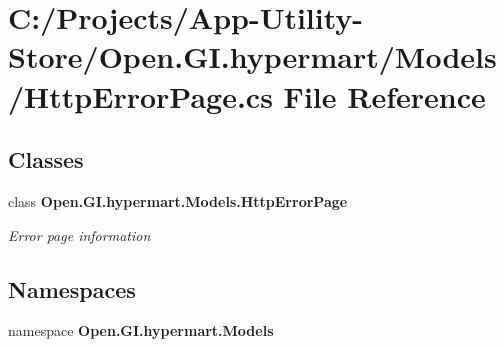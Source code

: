 \section{C\+:/\+Projects/\+App-\/\+Utility-\/\+Store/\+Open.G\+I.\+hypermart/\+Models/\+Http\+Error\+Page.cs File Reference}
\label{_http_error_page_8cs}
\subsection*{Classes}
\begin{DoxyCompactItemize}
\item 
class \textbf{ Open.\+G\+I.\+hypermart.\+Models.\+Http\+Error\+Page}
\begin{DoxyCompactList}\small\item\em Error page information \end{DoxyCompactList}\end{DoxyCompactItemize}
\subsection*{Namespaces}
\begin{DoxyCompactItemize}
\item 
namespace \textbf{ Open.\+G\+I.\+hypermart.\+Models}
\end{DoxyCompactItemize}
